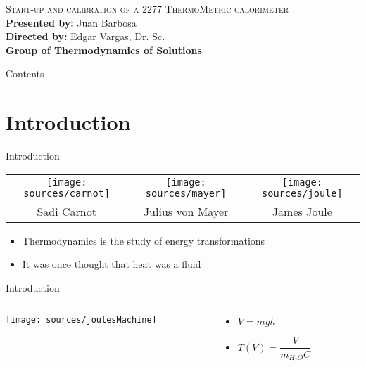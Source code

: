\documentclass[handout]{beamer}
\begin{document}
	\begin{frame}
		\centering
		\textsc{\Large Start-up and calibration of a 2277 ThermoMetric calorimeter}
		\\
		\vspace{5cm}
		\raggedleft \textbf{Presented by:} Juan Barbosa\\
		\raggedleft \textbf{Directed by:} Edgar Vargas, Dr. Sc.\\
		\raggedleft \textbf{Group of Thermodynamics of Solutions}
	\end{frame}

\begin{frame}{Contents}
	\tableofcontents
\end{frame}

\section{Introduction}
\begin{frame}{Introduction}
	\begin{table}[h]
		\centering
		\begin{tabular}{ccc}
			\texttt{[image: sources/carnot]} & 
			\texttt{[image: sources/mayer]} & 
			\texttt{[image: sources/joule]}\\
			Sadi Carnot & Julius von Mayer & James Joule	
		\end{tabular}
	\end{table}
	\begin{itemize}
		\item Thermodynamics is the study of energy transformations
		\item It was once thought that heat was a fluid
	\end{itemize}
\end{frame}

\begin{frame}{Introduction}
	\begin{columns}
		\begin{column}{0.5\textwidth}
			\texttt{[image: sources/joulesMachine]}
		\end{column}
		\begin{column}{0.5\textwidth}
			\begin{itemize}
				\item $V = mgh$
				\item $T(V) = \dfrac{V}{m_{H_2O}C}$
			\end{itemize}
		\end{column}
	\end{columns}
\end{frame}
\end{document}
